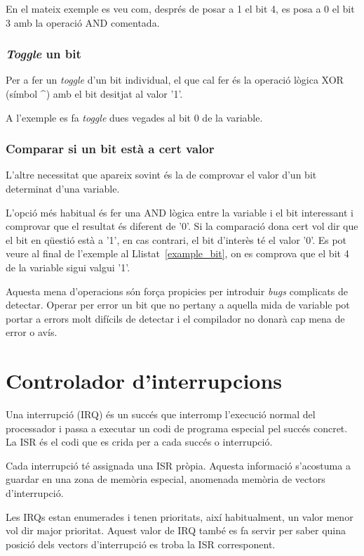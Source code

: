 En el mateix exemple es veu com, després de posar a 1 el bit 4, es posa a 0 el bit 3 amb la operació AND comentada.

\index{\^{}}
\subsection{{\em Toggle} un bit}
Per a fer un {\em toggle} d'un bit individual, el que cal fer és la operació lògica XOR (símbol {\bf \^{}}) amb el bit desitjat al valor '1'.

A l'exemple es fa {\em toggle} dues vegades al bit 0 de la variable.

\subsection{Comparar si un bit està a cert valor}
L'altre necessitat que apareix sovint és la de comprovar el valor d'un bit determinat d'una variable.

L'opció més habitual és fer una AND lògica entre la variable i el bit interessant i comprovar que el resultat és diferent de '0'. Si la comparació dona cert vol dir que el bit en qüestió està a '1', en cas contrari, el bit d'interès té el valor '0'. Es pot veure al final de l'exemple al Llistat~\ref{example_bit}, on es comprova que el bit 4 de la variable sigui valgui '1'.

\begin{remark}
Aquesta mena d'operacions són força propicies per introduir {\em bugs} complicats de detectar. Operar per error un bit que no pertany a aquella mida de variable pot portar a errors molt difícils de detectar i el compilador no donarà cap mena de error o avís.
\end{remark}


\chapter{Controlador d'interrupcions}
\label{ch:IRQ}
Una interrupció (\gls{IRQ}) és un succés que interromp l'execució normal del processador i passa a executar un codi de programa especial pel succés concret. La \gls{ISR} és el codi que es crida per a cada succés o interrupció.

Cada interrupció té assignada una ISR pròpia. Aquesta informació s'acostuma a guardar en una zona de memòria especial, anomenada memòria de vectors d'interrupció.

Les IRQs estan enumerades i tenen prioritats, així habitualment, un valor menor vol dir major prioritat. Aquest valor de IRQ també es fa servir per saber quina posició dels vectors d'interrupció es troba la ISR corresponent.

